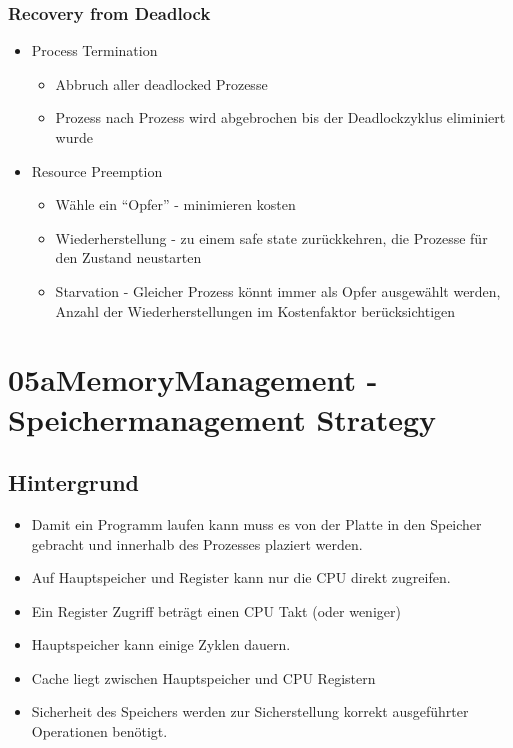 \documentclass[a4paper]{scrreprt}
\begin{document}
	\subsection{Recovery from Deadlock}
				\begin{itemize}
					\item Process Termination
						\begin{itemize}
							\item Abbruch aller deadlocked Prozesse
							\item Prozess nach Prozess wird abgebrochen bis der Deadlockzyklus eliminiert wurde
						\end{itemize}
					\item Resource Preemption
						\begin{itemize}
							\item Wähle ein "`Opfer"' - minimieren kosten
							\item Wiederherstellung - zu einem safe state zurückkehren, die Prozesse für den Zustand neustarten
							\item Starvation - Gleicher Prozess könnt immer als Opfer ausgewählt werden, Anzahl der Wiederherstellungen im Kostenfaktor berücksichtigen
						\end{itemize}
				\end{itemize}

\chapter{05aMemoryManagement - Speichermanagement Strategy}
\section{Hintergrund}
\begin{itemize}
\item Damit ein Programm laufen kann muss es von der Platte in den Speicher gebracht und innerhalb des Prozesses plaziert werden.

\item Auf Hauptspeicher und Register kann nur die CPU direkt zugreifen.

\item Ein Register Zugriff beträgt einen CPU Takt (oder weniger)

\item Hauptspeicher kann einige Zyklen dauern.

\item Cache liegt zwischen Hauptspeicher und CPU Registern

\item Sicherheit des Speichers werden zur Sicherstellung korrekt ausgeführter Operationen benötigt.

\end{itemize}
\end{document}
